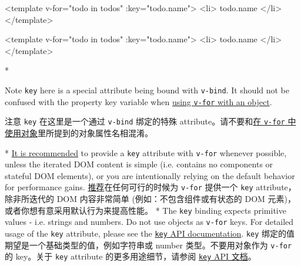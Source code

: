 \begin{paracol}{2}
\begin{codeHtml}
<template v-for="todo in todos" :key="todo.name">
    <li>{{ todo.name }}</li>
</template>
\end{codeHtml}
\switchcolumn
\begin{codeHtml}
<template v-for="todo in todos" :key="todo.name">
    <li>{{ todo.name }}</li>
</template>
\end{codeHtml}
\switchcolumn[0]*%
\begin{vueQuote}{Note}
\texttt{key} here is a special attribute being bound with
\texttt{v-bind}. It should not be confused with the property key
variable when
\href{https://vuejs.org/guide/essentials/list.html\#v-for-with-an-object}{using
\texttt{v-for} with an object}.
\end{vueQuote}
\switchcolumn
\begin{vueQuote}{注意}
\texttt{key} 在这里是一个通过 \texttt{v-bind} 绑定的特殊
attribute。请不要和\href{https://cn.vuejs.org/guide/essentials/list.html\#v-for-with-an-object}{在
\texttt{v-for} 中使用对象}里所提到的对象属性名相混淆。
\end{vueQuote}


\switchcolumn[0]*%
\href{https://vuejs.org/style-guide/rules-essential.html\#use-keyed-v-for}{It
is recommended} to provide a \texttt{key} attribute with \texttt{v-for}
whenever possible, unless the iterated DOM content is simple (i.e.
contains no components or stateful DOM elements), or you are
intentionally relying on the default behavior for performance gains.
\switchcolumn
\href{https://cn.vuejs.org/style-guide/rules-essential.html\#use-keyed-v-for}{推荐}在任何可行的时候为
\texttt{v-for} 提供一个 \texttt{key} attribute，除非所迭代的 DOM
内容非常简单 (例如：不包含组件或有状态的 DOM
元素)，或者你想有意采用默认行为来提高性能。
\switchcolumn[0]*%
The \texttt{key} binding expects primitive values - i.e. strings and
numbers. Do not use objects as \texttt{v-for} keys. For detailed usage
of the \texttt{key} attribute, please see the
\href{https://vuejs.org/api/built-in-special-attributes.html\#key}{\texttt{key}
API documentation}.
\switchcolumn
\texttt{key} 绑定的值期望是一个基础类型的值，例如字符串或 number
类型。不要用对象作为 \texttt{v-for} 的 key。关于 \texttt{key} attribute
的更多用途细节，请参阅
\href{https://cn.vuejs.org/api/built-in-special-attributes.html\#key}{\texttt{key}
API 文档}。
\end{paracol}



